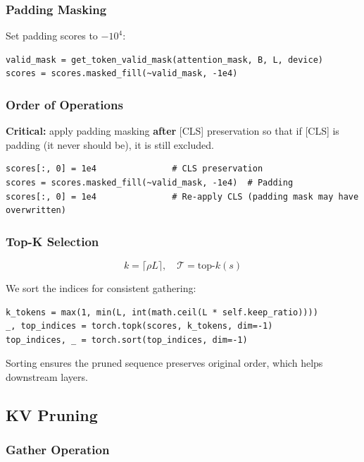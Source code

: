 {\subsubsection{Padding Masking}

Set padding scores to $-10^4$:

\begin{lstlisting}
valid_mask = get_token_valid_mask(attention_mask, B, L, device)
scores = scores.masked_fill(~valid_mask, -1e4)
\end{lstlisting}

\subsubsection{Order of Operations}

\textbf{Critical:} apply padding masking \textbf{after} [CLS] preservation so that 
if [CLS] is padding (it never should be), it is still excluded.

\begin{lstlisting}
scores[:, 0] = 1e4               # CLS preservation
scores = scores.masked_fill(~valid_mask, -1e4)  # Padding
scores[:, 0] = 1e4               # Re-apply CLS (padding mask may have overwritten)
\end{lstlisting}

\subsubsection{Top-K Selection}

\[
k = \lceil \rho L \rceil, \quad
\mathcal{T} = \text{top-}k(s)
\tag{4.2}
\]

We sort the indices for consistent gathering:

\begin{lstlisting}
k_tokens = max(1, min(L, int(math.ceil(L * self.keep_ratio))))
_, top_indices = torch.topk(scores, k_tokens, dim=-1)
top_indices, _ = torch.sort(top_indices, dim=-1)
\end{lstlisting}

Sorting ensures the pruned sequence preserves original order, which helps 
downstream layers.

\subsection{KV Pruning}

\subsubsection{Gather Operation}

}
